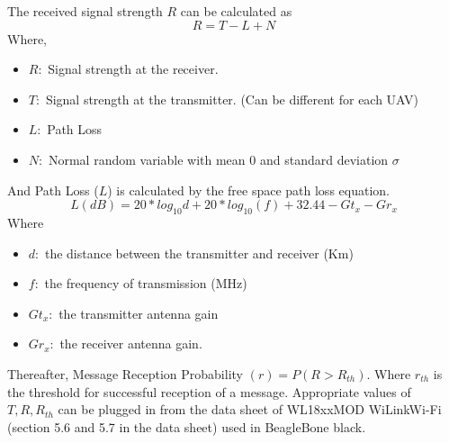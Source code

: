 The received signal strength $R$ can be calculated as 
\begin{equation}
    R = T - L + N
\end{equation} 
Where,
\begin{itemize}
    \item $R : $ Signal strength at the receiver.
    \item $T : $ Signal strength at the transmitter. (Can be different for each UAV)
    \item $L : $ Path Loss
    \item $N : $ Normal random variable with mean $0$ and standard deviation $\sigma$
\end{itemize}
And Path Loss ($L$) is calculated by the free space path loss equation.
\begin{equation}
 L (dB) = 20 * log_{10} d + 20 * log_{10}(f) + 32.44 - Gt_x - Gr_x 
\end{equation}
Where
\begin{itemize}
    \item $d : $ the distance between the transmitter and receiver (Km)
	\item $f : $ the frequency of transmission (MHz)
    \item $Gt_x : $ the transmitter antenna gain 
    \item $Gr_x : $ the receiver antenna gain.
\end{itemize}

Thereafter, Message Reception Probability $(r) = P(R > R_{th})$. Where $r_{th}$ is the threshold for successful reception of a message. Appropriate values of $T, R, R_{th}$ can be plugged in from the data sheet of WL18xxMOD WiLink\texttrademark Wi-Fi\textregistered   \cite{wilink} (section 5.6 and 5.7 in the data sheet) used in BeagleBone black.

